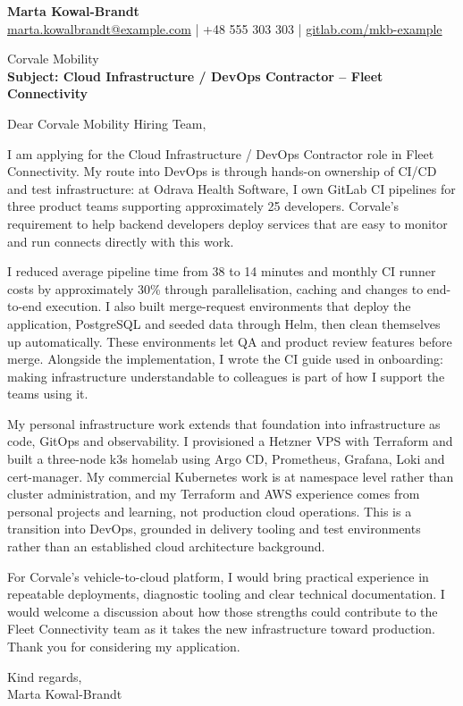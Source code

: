 \documentclass[11pt,a4paper]{article}
\begin{document}
{\Large\bfseries\color{primarycolor} Marta Kowal-Brandt}\\[0.3em]
{\small \href{mailto:marta.kowalbrandt@example.com}{marta.kowalbrandt@example.com} | +48 555 303 303 | \href{https://gitlab.com/mkb-example}{gitlab.com/mkb-example}}

Corvale Mobility\\
\textbf{Subject: Cloud Infrastructure / DevOps Contractor -- Fleet Connectivity}

Dear Corvale Mobility Hiring Team,

I am applying for the Cloud Infrastructure / DevOps Contractor role in Fleet Connectivity. My route into DevOps is through hands-on ownership of CI/CD and test infrastructure: at Odrava Health Software, I own GitLab CI pipelines for three product teams supporting approximately 25 developers. Corvale's requirement to help backend developers deploy services that are easy to monitor and run connects directly with this work.

I reduced average pipeline time from 38 to 14 minutes and monthly CI runner costs by approximately 30\% through parallelisation, caching and changes to end-to-end execution. I also built merge-request environments that deploy the application, PostgreSQL and seeded data through Helm, then clean themselves up automatically. These environments let QA and product review features before merge. Alongside the implementation, I wrote the CI guide used in onboarding: making infrastructure understandable to colleagues is part of how I support the teams using it.

My personal infrastructure work extends that foundation into infrastructure as code, GitOps and observability. I provisioned a Hetzner VPS with Terraform and built a three-node k3s homelab using Argo CD, Prometheus, Grafana, Loki and cert-manager. My commercial Kubernetes work is at namespace level rather than cluster administration, and my Terraform and AWS experience comes from personal projects and learning, not production cloud operations. This is a transition into DevOps, grounded in delivery tooling and test environments rather than an established cloud architecture background.

For Corvale's vehicle-to-cloud platform, I would bring practical experience in repeatable deployments, diagnostic tooling and clear technical documentation. I would welcome a discussion about how those strengths could contribute to the Fleet Connectivity team as it takes the new infrastructure toward production. Thank you for considering my application.

Kind regards,\\
Marta Kowal-Brandt
\end{document}
